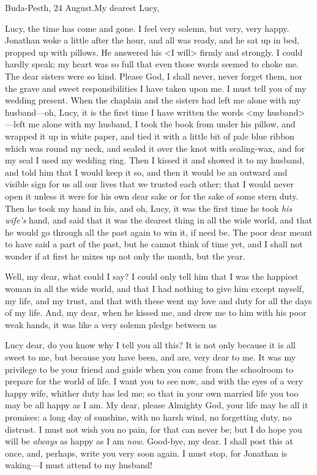 \begin{mail}{Buda-Pesth, 24 August.}{My dearest Lucy,}
 
Lucy, the time has come and gone. I feel very solemn, but very, very happy. Jonathan woke a little after the hour, and all was ready, and he sat up in bed, propped up with pillows. He answered his <I will> firmly and strongly. I could hardly speak; my heart was so full that even those words seemed to choke me. The dear sisters were so kind. Please God, I shall never, never forget them, nor the grave and sweet responsibilities I have taken upon me. I must tell you of my wedding present. When the chaplain and the sisters had left me alone with my husband—oh, Lucy, it is the first time I have written the words <my husband>—left me alone with my husband, I took the book from under his pillow, and wrapped it up in white paper, and tied it with a little bit of pale blue ribbon which was round my neck, and sealed it over the knot with sealing-wax, and for my seal I used my wedding ring. Then I kissed it and showed it to my husband, and told him that I would keep it so, and then it would be an outward and visible sign for us all our lives that we trusted each other; that I would never open it unless it were for his own dear sake or for the sake of some stern duty. Then he took my hand in his, and oh, Lucy, it was the first time he took \textit{his wife's} hand, and said that it was the dearest thing in all the wide world, and that he would go through all the past again to win it, if need be. The poor dear meant to have said a part of the past, but he cannot think of time yet, and I shall not wonder if at first he mixes up not only the month, but the year.

Well, my dear, what could I say? I could only tell him that I was the happiest woman in all the wide world, and that I had nothing to give him except myself, my life, and my trust, and that with these went my love and duty for all the days of my life. And, my dear, when he kissed me, and drew me to him with his poor weak hands, it was like a very solemn pledge between us

Lucy dear, do you know why I tell you all this? It is not only because it is all sweet to me, but because you have been, and are, very dear to me. It was my privilege to be your friend and guide when you came from the schoolroom to prepare for the world of life. I want you to see now, and with the eyes of a very happy wife, whither duty has led me; so that in your own married life you too may be all happy as I am. My dear, please Almighty God, your life may be all it promises: a long day of sunshine, with no harsh wind, no forgetting duty, no distrust. I must not wish you no pain, for that can never be; but I do hope you will be \textit{always} as happy as I am \textit{now}. Good-bye, my dear. I shall post this at once, and, perhaps, write you very soon again. I must stop, for Jonathan is waking—I must attend to my husband!

\end{mail}

